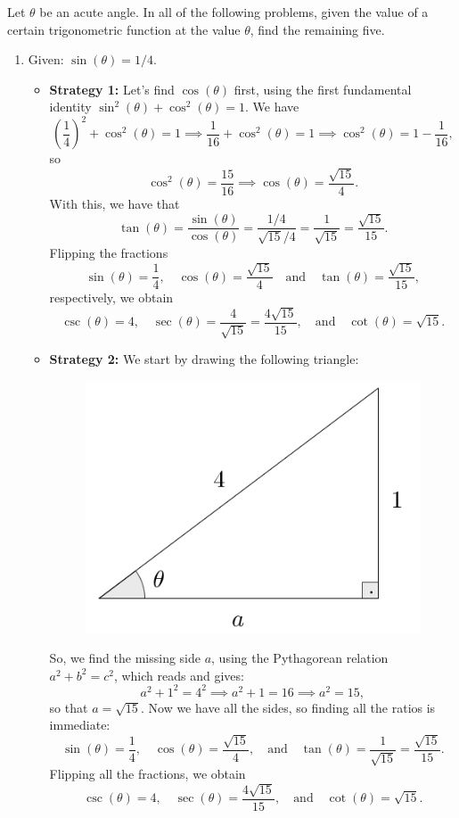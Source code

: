 \documentclass{ximera}
\begin{document}
\begin{example}
  Let $\theta$ be an acute angle. In all of the following problems, given the value of a certain trigonometric function at the value $\theta$, find the remaining five.
  \begin{enumerate}[label=\alph*.]
  \item Given: $\sin(\theta) = 1/4$.

    \begin{explanation}
      \begin{itemize}
      \item {\bf Strategy 1:}      Let's find $\cos(\theta)$ first, using the first fundamental identity $\sin^2(\theta)+\cos^2(\theta)=1$. We have $$\left(\frac{1}{4}\right)^2 + \cos^2(\theta)=1 \implies \frac{1}{16}+\cos^2(\theta)=1 \implies \cos^2(\theta) = 1-\frac{1}{16},$$so $$\cos^2(\theta) = \frac{15}{16} \implies \cos(\theta) = \frac{\sqrt{15}}{4}.$$ With this, we have that \[   \tan(\theta) = \frac{\sin(\theta)}{\cos(\theta)} = \frac{1/4}{\sqrt{15}/4} = \frac{1}{\sqrt{15}} = \frac{\sqrt{15}}{15}.  \]Flipping the fractions $$\sin(\theta) = \frac{1}{4}, \quad \cos(\theta) = \frac{\sqrt{15}}{4} \quad\mbox{and}\quad \tan(\theta) = \frac{\sqrt{15}}{15},$$respectively, we obtain $$\csc(\theta) = 4, \quad \sec(\theta) = \frac{4}{\sqrt{15}} = \frac{4\sqrt{15}}{15},\quad\mbox{and}\quad \cot(\theta) = \sqrt{15}.$$

      \item {\bf Strategy 2:}  We start by drawing the following triangle:
        \begin{figure}[h]
          \centering
          \includegraphics[scale=.3]{./figures/9-1-3-triangle-sin-1-4.png}
        \end{figure}
        So, we find the missing side $a$, using the Pythagorean relation $a^2+b^2=c^2$, which reads and gives: $$a^2+1^2 = 4^2 \implies a^2+1=16\implies a^2=15,$$so that $a=\sqrt{15}$. Now we have all the sides, so finding all the ratios is immediate: $$\sin(\theta) = \frac{1}{4},\quad \cos(\theta)=\frac{\sqrt{15}}{4},\quad\mbox{and}\quad\tan(\theta)=\frac{1}{\sqrt{15}}=\frac{\sqrt{15}}{15}.$$Flipping all the fractions, we obtain$$\csc(\theta) = 4,\quad \sec(\theta)=\frac{4\sqrt{15}}{15},\quad\mbox{and}\quad\cot(\theta)=\sqrt{15}.$$
      \end{itemize}
    \end{explanation}
    

\end{enumerate}
\end{example}
\end{document}

